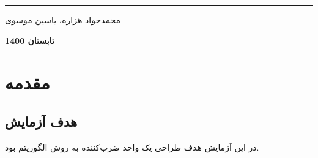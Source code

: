 \documentclass[12pt,onecolumn,a4paper,fleqn]{article}
\begin{document}
\begin{titlepage}
\begin{center}
			\noindent\rule[1ex]{\linewidth}{1pt}
			\vspace*{1.5cm}
			\begin{Large}
				محمدجواد هزاره، یاسین موسوی
				
				\vspace*{1.5cm}
				\textbf{
					تابستان 1400
				}
			\end{Large}			
		\end{center}
		\thispagestyle{empty}
	\end{titlepage}	
	\pagebreak
	
	\tableofcontents
	\thispagestyle{empty}
	\pagebreak
	\section{مقدمه}
	\subsection{هدف آزمایش}
	در این آزمایش هدف طراحی یک واحد ضرب‌کننده به روش الگوریتم
	بود.
\end{document}
